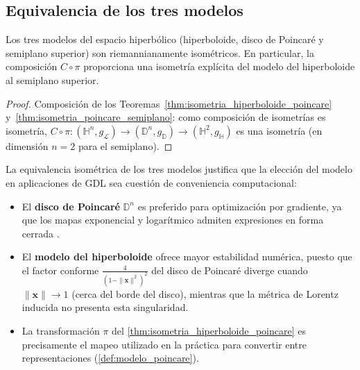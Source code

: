 \subsection{Equivalencia de los tres modelos}\label{subsec:equivalencia_modelos}

\begin{corollary}\label{cor:equivalencia_modelos_hiperbolicos}
Los tres modelos del espacio hiperbólico (hiperboloide, disco de Poincaré y semiplano superior) son riemannianamente isométricos. En particular, la composición $C \circ \pi$ proporciona una isometría explícita del modelo del hiperboloide al semiplano superior.
\end{corollary}

\begin{proof}
Composición de los Teoremas~\ref{thm:isometria_hiperboloide_poincare} y~\ref{thm:isometria_poincare_semiplano}: como composición de isometrías es isometría, $C \circ \pi: (\mathbb{H}^n, g_{\mathcal{L}}) \to (\mathbb{D}^n, g_{\mathbb{D}}) \to (\mathbb{H}^2, g_{\mathbb{H}})$ es una isometría (en dimensión $n = 2$ para el semiplano).
\end{proof}

\begin{remark}\label{rem:modelos_gdl}
La equivalencia isométrica de los tres modelos justifica que la elección del modelo en aplicaciones de GDL sea cuestión de conveniencia computacional:
\begin{itemize}
    \item El \textbf{disco de Poincaré} $\mathbb{D}^n$ es preferido para optimización por gradiente, ya que los mapas exponencial y logarítmico admiten expresiones en forma cerrada \citep{nickel2017poincare}.
    \item El \textbf{modelo del hiperboloide} ofrece mayor estabilidad numérica, puesto que el factor conforme $\frac{4}{(1-\|\mathbf{x}\|^2)^2}$ del disco de Poincaré diverge cuando $\|\mathbf{x}\| \to 1$ (cerca del borde del disco), mientras que la métrica de Lorentz inducida no presenta esta singularidad.
    \item La transformación $\pi$ del \autoref{thm:isometria_hiperboloide_poincare} es precisamente el mapeo utilizado en la práctica para convertir entre representaciones (\autoref{def:modelo_poincare}).
\end{itemize}
\end{remark}

